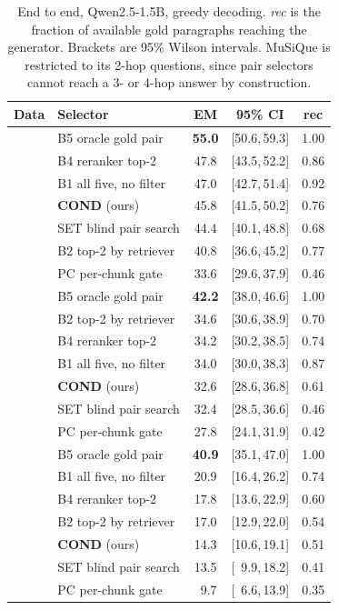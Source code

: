 \documentclass[conference]{IEEEtran}
\begin{document}
\begin{table}[t]
\centering
\caption{End to end, Qwen2.5-1.5B, greedy decoding. \emph{rec} is the fraction
of available gold paragraphs reaching the generator. Brackets are 95\% Wilson
intervals. MuSiQue is restricted to its 2-hop questions, since pair selectors
cannot reach a 3- or 4-hop answer by construction.}
\label{tab:endtoend}
\setlength{\tabcolsep}{3pt}
\begin{tabular}{@{}llccc@{}}
\toprule
\textbf{Data} & \textbf{Selector} & \textbf{EM} & \textbf{95\% CI} & \textbf{rec}\\
\midrule
{}
 & B5 oracle gold pair    & \textbf{55.0} & [50.6,\,59.3] & 1.00\\
 & B4 reranker top-2      & 47.8 & [43.5,\,52.2] & 0.86\\
 & B1 all five, no filter & 47.0 & [42.7,\,51.4] & 0.92\\
 & \textbf{COND} (ours)   & 45.8 & [41.5,\,50.2] & 0.76\\
 & SET blind pair search  & 44.4 & [40.1,\,48.8] & 0.68\\
 & B2 top-2 by retriever  & 40.8 & [36.6,\,45.2] & 0.77\\
 & PC per-chunk gate      & 33.6 & [29.6,\,37.9] & 0.46\\
\midrule
{}
 & B5 oracle gold pair    & \textbf{42.2} & [38.0,\,46.6] & 1.00\\
 & B2 top-2 by retriever  & 34.6 & [30.6,\,38.9] & 0.70\\
 & B4 reranker top-2      & 34.2 & [30.2,\,38.5] & 0.74\\
 & B1 all five, no filter & 34.0 & [30.0,\,38.3] & 0.87\\
 & \textbf{COND} (ours)   & 32.6 & [28.6,\,36.8] & 0.61\\
 & SET blind pair search  & 32.4 & [28.5,\,36.6] & 0.46\\
 & PC per-chunk gate      & 27.8 & [24.1,\,31.9] & 0.42\\
\midrule
{}
 & B5 oracle gold pair    & \textbf{40.9} & [35.1,\,47.0] & 1.00\\
 & B1 all five, no filter & 20.9 & [16.4,\,26.2] & 0.74\\
 & B4 reranker top-2      & 17.8 & [13.6,\,22.9] & 0.60\\
 & B2 top-2 by retriever  & 17.0 & [12.9,\,22.0] & 0.54\\
 & \textbf{COND} (ours)   & 14.3 & [10.6,\,19.1] & 0.51\\
 & SET blind pair search  & 13.5 & [\ 9.9,\,18.2] & 0.41\\
 & PC per-chunk gate      & \ 9.7 & [\ 6.6,\,13.9] & 0.35\\
\bottomrule
\end{tabular}
\end{table}
\end{document}

